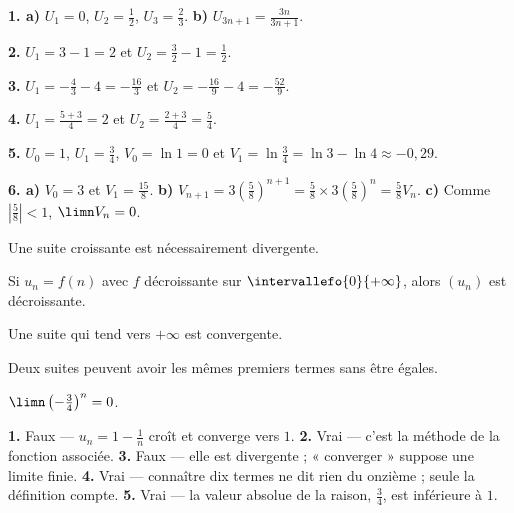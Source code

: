 \begin{corrige}[annales]
\textbf{1. a)} $U_{1} = 0$, $U_{2} = \frac12$, $U_{3} = \frac23$.
\textbf{b)} $U_{3n+1} = \frac{3n}{3n+1}$.

\textbf{2.} $U_{1} = 3-1 = 2$ et $U_{2} = \frac32-1 = \frac12$.

\textbf{3.} $U_{1} = -\frac43-4 = -\frac{16}{3}$ et
$U_{2} = -\frac{16}{9}-4 = -\frac{52}{9}$.

\textbf{4.} $U_{1} = \frac{5+3}{4} = 2$ et $U_{2} = \frac{2+3}{4}
= \frac54$.

\textbf{5.} $U_{0} = 1$, $U_{1} = \frac34$, $V_{0} = \ln1 = 0$ et
$V_{1} = \ln\frac34 = \ln3-\ln4 \approx -0{,}29$.

\textbf{6. a)} $V_{0} = 3$ et $V_{1} = \frac{15}{8}$.
\textbf{b)} $V_{n+1} = 3\left(\frac58\right)^{n+1}
= \frac58\times3\left(\frac58\right)^{n} = \frac58 V_{n}$.
\textbf{c)} Comme $\left|\frac58\right|<1$, $\limn V_{n} = 0$.
\end{corrige}

\begin{vraifaux}
\exo Une suite croissante est nécessairement divergente.

\exo Si $u_{n} = f(n)$ avec $f$ décroissante sur
$\intervallefo{0}{+\infty}$, alors $\left(u_{n}\right)$ est décroissante.

\exo Une suite qui tend vers $+\infty$ est convergente.

\exo Deux suites peuvent avoir les mêmes premiers termes sans être égales.

\exo $\limn \left(-\frac34\right)^{n} = 0$.
\end{vraifaux}

\begin{corrige}
\textbf{1.} Faux — $u_{n} = 1-\frac1n$ croît et converge vers $1$.
\textbf{2.} Vrai — c'est la méthode de la fonction associée.
\textbf{3.} Faux — elle est divergente ; « converger » suppose une limite
finie.
\textbf{4.} Vrai — connaître dix termes ne dit rien du onzième ; seule la
définition compte.
\textbf{5.} Vrai — la valeur absolue de la raison, $\frac34$, est
inférieure à $1$.
\end{corrige}


